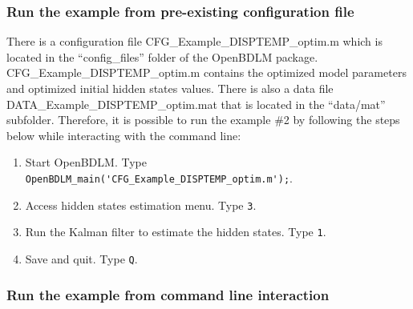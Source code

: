 \subsubsection{Run the example from pre-existing configuration file}
\label{SS:LoadConfigFileEx2}
There is a configuration file CFG\_Example\_DISPTEMP\_optim.m which is located in the ``config\_files'' folder of the OpenBDLM package.
CFG\_Example\_DISPTEMP\_optim.m contains the optimized model parameters and optimized initial hidden states values.
There is also a data file DATA\_Example\_DISPTEMP\_optim.mat that is located in the ``data/mat'' subfolder.
Therefore, it is possible to run the example \#2 by following the steps below while interacting with the \MATLAB{} command line:
\begin{enumerate}
\item Start OpenBDLM. Type \colorbox{light-gray}{\lstinline[basicstyle = \mlttfamily \small, backgroundcolor = \color{light-gray}]!OpenBDLM_main('CFG_Example_DISPTEMP_optim.m');!}.
\item Access hidden states estimation menu. Type \colorbox{light-gray}{\lstinline[basicstyle = \mlttfamily \small, backgroundcolor = \color{light-gray}]!3!}.
\item Run the Kalman filter to estimate the hidden states. Type \colorbox{light-gray}{\lstinline[basicstyle = \mlttfamily \small, backgroundcolor = \color{light-gray}]!1!}.
\item Save and quit. Type \colorbox{light-gray}{\lstinline[basicstyle = \mlttfamily \small, backgroundcolor = \color{light-gray}]!Q!}.
\end{enumerate}


\subsubsection{Run the example from command line interaction}


